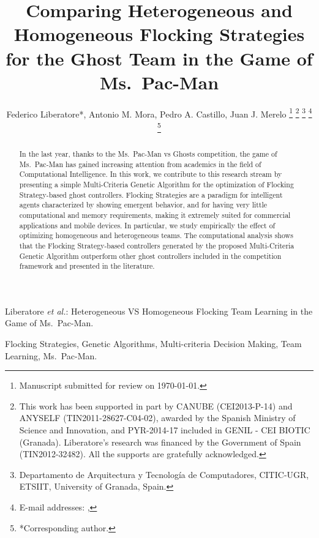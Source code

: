 \documentclass[journal]{IEEEtran}
\begin{document}
\title{Comparing Heterogeneous and Homogeneous Flocking Strategies for the Ghost Team in the Game of Ms.\  Pac-Man}

\author{Federico Liberatore*, Antonio M. Mora, Pedro A. Castillo, Juan J. Merelo
\thanks{Manuscript submitted for review on \today.}%
\thanks{This work has been supported in part by CANUBE (CEI2013-P-14) and ANYSELF (TIN2011-28627-C04-02), awarded by the Spanish Ministry of Science and Innovation, and PYR-2014-17 included in GENIL - CEI BIOTIC (Granada). Liberatore's research was financed by the Government of Spain (TIN2012-32482). All the supports are gratefully acknowledged.}%
\thanks{Departamento de Arquitectura y Tecnolog\'ia de Computadores,
CITIC-UGR, ETSIIT,
University of Granada, Spain.}%
\thanks{E-mail addresses: \mailsa, \mailsb}%
\thanks{*Corresponding author.}}

%
{Liberatore \MakeLowercase{\textit{et al.}}: Heterogeneous VS Homogeneous Flocking Team Learning in the Game of Ms.\  Pac-Man.}
\maketitle

\begin{abstract}
In the last year, thanks to the Ms.\  Pac-Man vs Ghosts competition, the
game of Ms.\  Pac-Man has gained increasing attention from academics in
the field of Computational Intelligence. In this work, we contribute
to this research stream by presenting a simple Multi-Criteria Genetic
Algorithm for the optimization of Flocking Strategy-based ghost
controllers. Flocking Strategies are a paradigm for intelligent agents
characterized by showing emergent behavior, and for having very little
computational and memory requirements, making it extremely suited for
commercial applications and mobile devices. In particular, we study
empirically the effect of optimizing homogeneous and heterogeneous
teams. The computational analysis shows that the Flocking
Strategy-based controllers generated by the proposed Multi-Criteria
Genetic Algorithm outperform other ghost controllers
included in the competition framework and presented in the
literature. 
\end{abstract}
\begin{IEEEkeywords}
Flocking Strategies, Genetic Algorithms, Multi-criteria Decision Making, Team Learning, Ms.\  Pac-Man.
\end{IEEEkeywords}
\end{document}
